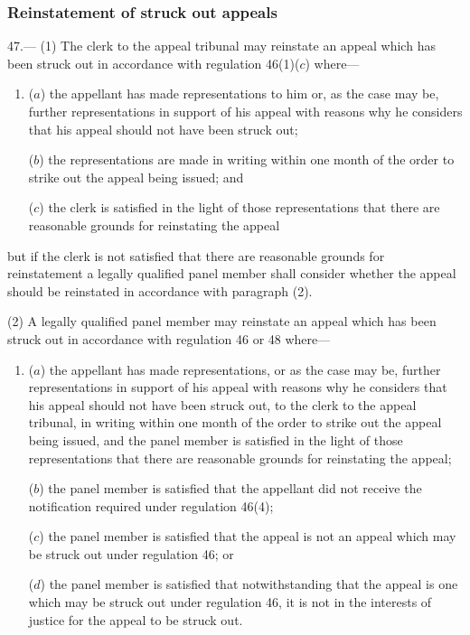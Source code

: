 \documentclass[12pt,a4paper]{article}
\begin{document}
\subsubsection[47. Reinstatement of struck out appeals]{Reinstatement of struck out appeals}

47.---%
(1) The clerk to the appeal tribunal may reinstate an appeal which has been struck out in accordance with regulation 46(1)($c$)  where—
\begin{enumerate}\item[]
($a$) the appellant has made representations to him or, as the case may be, further representations in support of his appeal with reasons why he considers that his appeal should not have been struck out;

($b$) the representations are made in writing within one month of the order to strike out the appeal being issued; and

($c$) the clerk is satisfied in the light of those representations that there are reasonable grounds for reinstating the appeal
\end{enumerate}
but if the clerk is not satisfied that there are reasonable grounds for reinstatement a legally qualified panel member shall consider whether the appeal should be reinstated in accordance with paragraph (2).

(2) %
A legally qualified panel member may reinstate an appeal which has been struck out in accordance with regulation 46 
or 48  %
where—
\begin{enumerate}\item[]
($a$) the appellant has made representations, or as the case may be, further representations in support of his appeal with reasons why he considers that his appeal should not have been struck out, to the clerk to the appeal tribunal, in writing within one month of the order to strike out the appeal being issued, and the panel member is satisfied in the light of those representations that there are reasonable grounds for reinstating the appeal;

($b$) the panel member is satisfied that the appellant did not receive the notification required under regulation 46(4);

($c$) the panel member is satisfied that the appeal is not an appeal which may be struck out under regulation 46; or

($d$) the panel member is satisfied that notwithstanding that the appeal is one which may be struck out under regulation 46, it is not in the interests of justice for the appeal to be struck out.
\end{enumerate}
\end{document}
